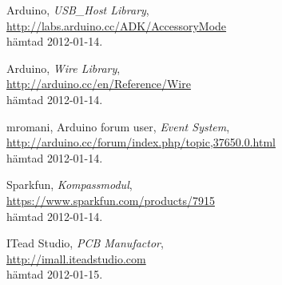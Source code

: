 \begin{thebibliography}{9}
Arduino,
\emph{USB\_Host Library}, \\
\url{http://labs.arduino.cc/ADK/AccessoryMode} \\
hämtad 2012-01-14.

Arduino,
\emph{Wire Library}, \\
\url{http://arduino.cc/en/Reference/Wire} \\
hämtad 2012-01-14.

mromani, Arduino forum user,
\emph{Event System}, \\
\url{http://arduino.cc/forum/index.php/topic,37650.0.html} \\
hämtad 2012-01-14.

Sparkfun,
\emph{Kompassmodul}, \\
\url{https://www.sparkfun.com/products/7915} \\
hämtad 2012-01-14.

ITead Studio,
\emph{PCB Manufactor}, \\
\url{http://imall.iteadstudio.com} \\
hämtad 2012-01-15.
\end{thebibliography}
